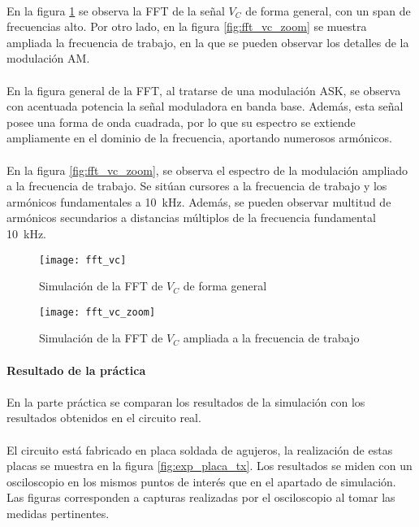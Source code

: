 \paragraph{}
En la figura \ref{fig:sim_fft} se observa la FFT de la señal $V_C$ de forma general, con un span de frecuencias alto. Por otro lado, en la figura \ref{fig:fft_vc_zoom} se muestra ampliada la frecuencia de trabajo, en la que se pueden observar los detalles de la modulación AM.
\paragraph{}
En la figura general de la FFT, al tratarse de una modulación ASK, se observa con acentuada potencia la señal moduladora en banda base. Además, esta señal posee una forma de onda cuadrada, por lo que su espectro se extiende ampliamente en el dominio de la frecuencia, aportando numerosos armónicos.
\paragraph{}
En la figura \ref{fig:fft_vc_zoom}, se observa el espectro de la modulación ampliado a la frecuencia de trabajo. Se sitúan cursores a la frecuencia de trabajo y los armónicos fundamentales a \SI{10}{\kilo\hertz}. Además, se pueden observar multitud de armónicos secundarios a distancias múltiplos de la frecuencia fundamental \SI{10}{\kilo\hertz}.
\begin{figure}[h!]
    \centering
    \texttt{[image: fft\_vc]}
    \caption{Simulaci\'on de la FFT de $V_C$ de forma general}
    \label{fig:sim_fft}
\end{figure}
\begin{figure}[h!]
    \centering
    \texttt{[image: fft\_vc\_zoom]}
    \caption{Simulaci\'on de la FFT de $V_C$ ampliada a la frecuencia de trabajo}
    \label{fig:sim_fft_zoom}
\end{figure}

\paragraph{Resultado de la pr\'actica} %
\paragraph{}
En la parte práctica se comparan los resultados de la simulación con los resultados obtenidos en el circuito real. 
\paragraph{}
El circuito está fabricado en placa soldada de agujeros, la realizaci\'on de estas placas se muestra en la figura \ref{fig:exp_placa_tx}. Los resultados se miden con un osciloscopio en los mismos puntos de interés que en el apartado de simulación. Las figuras corresponden a capturas realizadas por el osciloscopio al tomar las medidas pertinentes.

